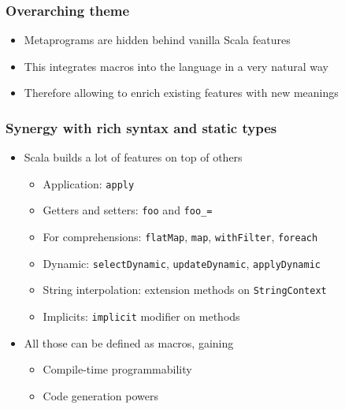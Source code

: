 \documentclass[svgnames,hyperref={bookmarks=false}]{beamer}
\begin{document}
\begin{frame}[fragile]
\frametitle{Overarching theme}

\begin{itemize}
\item Metaprograms are hidden behind vanilla Scala features
\item This integrates macros into the language in a very natural way
\item Therefore allowing to enrich existing features with new meanings
\end{itemize}
\end{frame}

\begin{frame}[fragile]
\frametitle{Synergy with rich syntax and static types}

\begin{itemize}
\item Scala builds a lot of features on top of others
\begin{itemize}
\item Application: \texttt{apply}
\item Getters and setters: \texttt{foo} and \texttt{foo\_=}
\item For comprehensions: \texttt{flatMap}, \texttt{map}, \texttt{withFilter}, \texttt{foreach}
\item Dynamic: \texttt{selectDynamic}, \texttt{updateDynamic}, \texttt{applyDynamic}
\item String interpolation: extension methods on \texttt{StringContext}
\item Implicits: \texttt{implicit} modifier on methods
\end{itemize}
\item All those can be defined as macros, gaining
\begin{itemize}
\item Compile-time programmability
\item Code generation powers
\end{itemize}
\end{itemize}
\end{frame}

\begin{frame}[fragile]
\frametitle{}

\vskip40pt
\begin{center}
\end{center}
\end{frame}

\begin{frame}[fragile]
\frametitle{}

\vskip40pt
\begin{center}
\end{center}
\end{frame}
\end{document}
